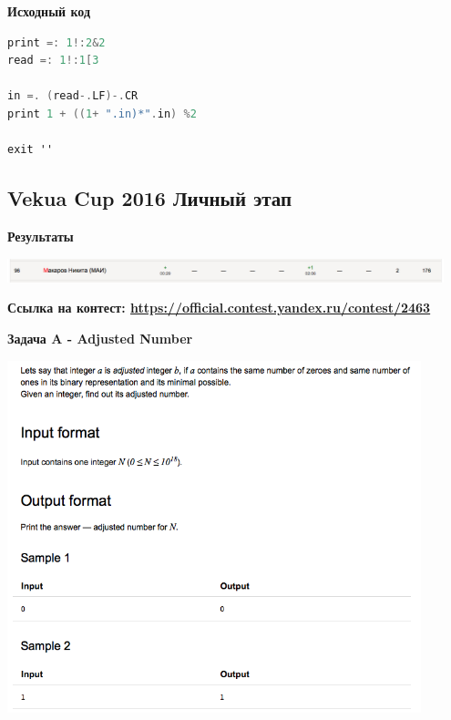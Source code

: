 \documentclass[a4paper,12pt]{article}
\begin{document}
\textbf{{\large Исходный код}} \\
\begin{lstlisting}[language=C]
print =: 1!:2&2
read =: 1!:1[3

in =. (read-.LF)-.CR
print 1 + ((1+ ".in)*".in) %2

exit ''
\end{lstlisting}








%
%
\newpage
\subsection{Vekua Cup 2016 Личный этап}

\textbf{{\large Результаты}} \\
\begin{center}
\includegraphics[width=0.95\textwidth]{Vekua_2016_Nikita/result.png}\\ [1cm]
\end{center}

\textbf{{\large Ссылка на контест: \url{https://official.contest.yandex.ru/contest/2463}}}

\newpage
\textbf{{\large Задача A - Adjusted Number}}

\begin{center}
\includegraphics[width=0.9\textwidth]{Vekua_2016_Nikita/A.png}\\ [1cm]
\end{center}
\end{document}
